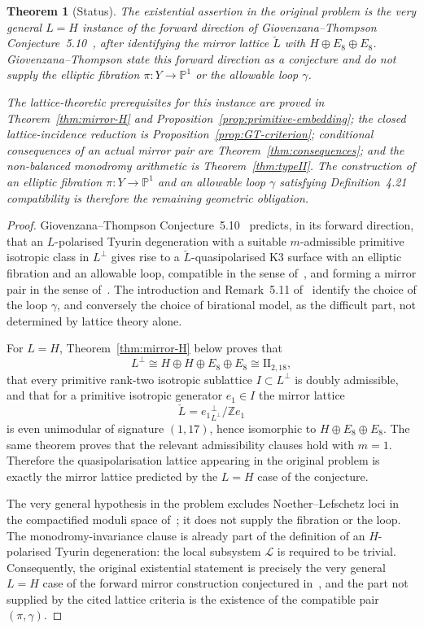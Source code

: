 \documentclass[12pt]{article}
\theoremstyle{plain}
\newtheorem{theorem}{Theorem}[section]
\theoremstyle{definition}
\newcommand{\bZ}{\mathbb{Z}}
\newcommand{\bP}{\mathbb{P}}
\newcommand{\Lcheck}{\check{L}}
\newcommand{\cL}{\mathcal{L}}
\begin{document}
\begin{theorem}[Status]\label{thm:status}
The existential assertion in the original problem is the very general $L=H$ instance of the forward direction of Giovenzana--Thompson Conjecture~5.10~\cite{GT24}, after identifying the mirror lattice $\Lcheck$ with $H\oplus E_8\oplus E_8$.  Giovenzana--Thompson state this forward direction as a conjecture and do not supply the elliptic fibration $\pi\colon Y\to \bP^1$ or the allowable loop $\gamma$.

The lattice-theoretic prerequisites for this instance are proved in Theorem~\ref{thm:mirror-H} and Proposition~\ref{prop:primitive-embedding}; the closed lattice-incidence reduction is Proposition~\ref{prop:GT-criterion}; conditional consequences of an actual mirror pair are Theorem~\ref{thm:consequences}; and the non-balanced monodromy arithmetic is Theorem~\ref{thm:typeII}.  The construction of an elliptic fibration $\pi\colon Y\to \bP^1$ and an allowable loop $\gamma$ satisfying Definition~4.21 compatibility is therefore the remaining geometric obligation.
\end{theorem}

\begin{proof}
Giovenzana--Thompson Conjecture~5.10~\cite{GT24} predicts, in its forward direction, that an $L$-polarised Tyurin degeneration with a suitable $m$-admissible primitive isotropic class in $L^\perp$ gives rise to a ${\check L}$-quasipolarised K3 surface with an elliptic fibration and an allowable loop, compatible in the sense of~\cite[Definition~4.21]{GT24}, and forming a mirror pair in the sense of~\cite[Definition~5.1]{GT24}.  The introduction and Remark~5.11 of~\cite{GT24} identify the choice of the loop $\gamma$, and conversely the choice of birational model, as the difficult part, not determined by lattice theory alone.

For $L=H$, Theorem~\ref{thm:mirror-H} below proves that
\[
L^\perp \cong H\oplus H\oplus E_8\oplus E_8\cong \mathrm{II}_{2,18},
\]
that every primitive rank-two isotropic sublattice $I\subset L^\perp$ is doubly admissible, and that for a primitive isotropic generator $e_1\in I$ the mirror lattice
\[
\Lcheck = {e_1}^{\perp}_{L^{\perp}}/\bZ e_1
\]
is even unimodular of signature $(1,17)$, hence isomorphic to $H\oplus E_8\oplus E_8$.  The same theorem proves that the relevant admissibility clauses hold with $m=1$.  Therefore the quasipolarisation lattice appearing in the original problem is exactly the mirror lattice predicted by the $L=H$ case of the conjecture.

The very general hypothesis in the problem excludes Noether--Lefschetz loci in the compactified moduli space of~\cite{ABE22}; it does not supply the fibration or the loop.  The monodromy-invariance clause is already part of the definition of an $H$-polarised Tyurin degeneration: the local subsystem $\cL$ is required to be trivial.  Consequently, the original existential statement is precisely the very general $L=H$ case of the forward mirror construction conjectured in~\cite{GT24}, and the part not supplied by the cited lattice criteria is the existence of the compatible pair $(\pi,\gamma)$.
\end{proof}
\end{document}
